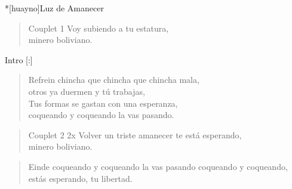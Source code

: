 \clearpage
\begin{song}*[huayno]{Luz de Amanecer}
\begin{verse}{Couplet 1}
Voy subiendo a tu estatura, \\
minero boliviano. \hspace{4em} \hspace{1em} 
\end{verse}

\begin{instrumental}{Intro}
\measure{}\measure{}\measure{}\measure{}
\measure{}\measure{}\measure{}\measure{}[:]
\end{instrumental}


\begin{verse}{Refrein}
chincha que chincha que chincha mala,\\
otros ya duermen y tú trabajas,\\
Tus formas se gastan con una esperanza,\\
coqueando y coqueando la vas pasando. \hspace{4em} \hspace{1em} 
\end{verse}


\begin{verse}{Couplet 2 2x}
Volver un triste amanecer te está esperando,\\
minero boliviano. \hspace{4em} \hspace{1em} 
\end{verse}


\begin{verse}{Einde}
coqueando y coqueando la vas pasando
coqueando y coqueando, estás esperando, tu libertad. \hspace{3em} \hspace{2em} \hspace{2em} \hspace{1em} \hspace{1em}
\end{verse}
\end{song}

